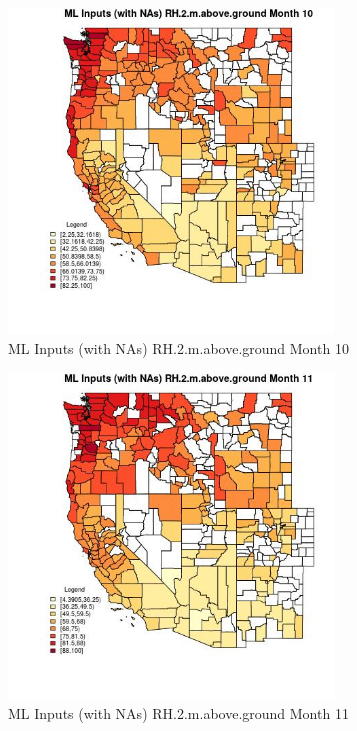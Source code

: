 \begin{figure} 
\centering  
\includegraphics[width=0.77\textwidth]{Code_Outputs/Report_ML_input_PM25_Step4_part_f_de_duplicated_aveswNAs_CountyRH2mabovegroundmedianMonth10.jpg} 
\caption{\label{fig:Report_ML_input_PM25_Step4_part_f_de_duplicated_aveswNAsCountyRH2mabovegroundmedianMonth10}ML Inputs (with NAs) RH.2.m.above.ground Month 10} 
\end{figure} 
 

\begin{figure} 
\centering  
\includegraphics[width=0.77\textwidth]{Code_Outputs/Report_ML_input_PM25_Step4_part_f_de_duplicated_aveswNAs_CountyRH2mabovegroundmedianMonth11.jpg} 
\caption{\label{fig:Report_ML_input_PM25_Step4_part_f_de_duplicated_aveswNAsCountyRH2mabovegroundmedianMonth11}ML Inputs (with NAs) RH.2.m.above.ground Month 11} 
\end{figure} 
 

